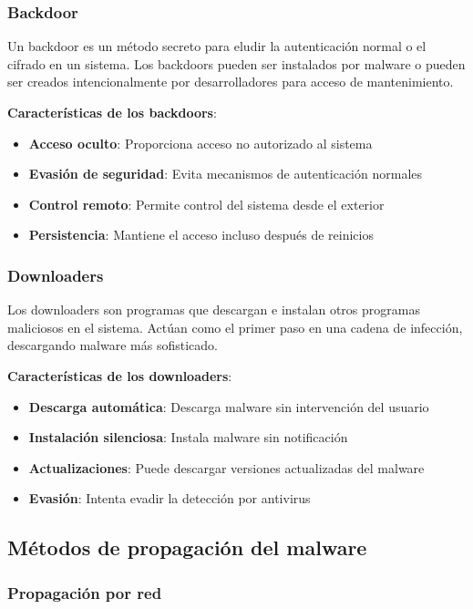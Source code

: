 \subsubsection{Backdoor}

Un backdoor es un método secreto para eludir la autenticación normal o el cifrado en un sistema. Los backdoors pueden ser instalados por malware o pueden ser creados intencionalmente por desarrolladores para acceso de mantenimiento.

\textbf{Características de los backdoors}:
\begin{itemize}
    \item \textbf{Acceso oculto}: Proporciona acceso no autorizado al sistema
    \item \textbf{Evasión de seguridad}: Evita mecanismos de autenticación normales
    \item \textbf{Control remoto}: Permite control del sistema desde el exterior
    \item \textbf{Persistencia}: Mantiene el acceso incluso después de reinicios
\end{itemize}

\subsubsection{Downloaders}

Los downloaders son programas que descargan e instalan otros programas maliciosos en el sistema. Actúan como el primer paso en una cadena de infección, descargando malware más sofisticado.

\textbf{Características de los downloaders}:
\begin{itemize}
    \item \textbf{Descarga automática}: Descarga malware sin intervención del usuario
    \item \textbf{Instalación silenciosa}: Instala malware sin notificación
    \item \textbf{Actualizaciones}: Puede descargar versiones actualizadas del malware
    \item \textbf{Evasión}: Intenta evadir la detección por antivirus
\end{itemize}

\subsection{Métodos de propagación del malware}

\subsubsection{Propagación por red}

